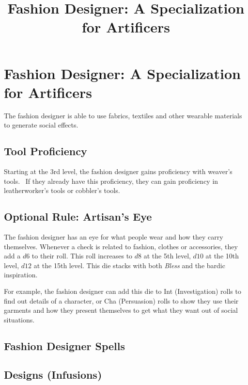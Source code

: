 \documentclass[twocolumn]{dndbook}
\begin{document}
\title{Fashion Designer: A Specialization for Artificers}

\section{Fashion Designer: A Specialization for Artificers}

The fashion designer is able to use fabrics, textiles and other wearable materials to generate social effects.

\subsection{Tool Proficiency}

Starting at the 3rd level, the fashion designer gains proficiency with weaver's tools.\
If they already have this proficiency, they can gain proficiency in leatherworker's tools or cobbler's tools.

\subsection{Optional Rule: Artisan's Eye}
The fashion designer has an eye for what people wear and how they carry themselves.
Whenever a check is related to fashion, clothes or accessories, they add a $d6$ to their roll.
This roll increases to $d8$ at the 5th level, $d10$ at the 10th level, $d12$ at the 15th level.
This die stacks with both \emph{Bless} and the bardic inspiration.\par

For example, the fashion designer can add this die to Int (Investigation) rolls to find out details of a character,
or Cha (Persuasion) rolls to show they use their garments and how they present themselves to get what they want out of social situations.\par

\subsection{Fashion Designer Spells}


\subsection{Designs (Infusions)}

\end{document}
